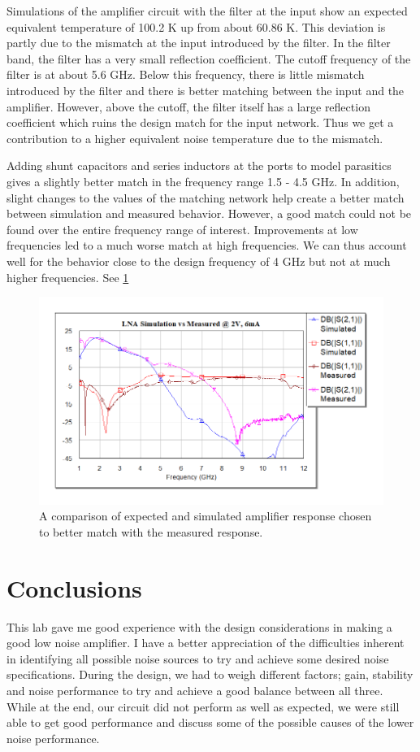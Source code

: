 \documentclass[twocolumn, aps, floatfix]{revtex4-1}
\begin{document}
Simulations of the amplifier circuit with the filter at the input show an expected equivalent temperature of 100.2 K up from about 60.86 K. This deviation is partly due to the mismatch at the input introduced by the filter. In the filter band, the filter has a very small reflection coefficient. The cutoff frequency of the filter is at about 5.6 GHz. Below this frequency, there is little mismatch introduced by the filter and there is better matching between the input and the amplifier. However, above the cutoff, the filter itself has a large reflection coefficient which ruins the design match for the input network. Thus we get a contribution to a higher equivalent noise temperature due to the mismatch.

Adding shunt capacitors and series inductors at the ports to model parasitics gives a slightly better match in the frequency range 1.5 - 4.5 GHz. In addition, slight changes to the values of the matching network help create a better match between simulation and measured behavior. However, a good match could not be found over the entire frequency range of interest. Improvements at low frequencies led to a much worse match at high frequencies. We can thus account well for the behavior close to the design frequency of 4 GHz but not at much higher frequencies. See \ref{fig:changedampsims}

    \begin{figure}[!htbp]
    \centering
    \includegraphics[scale=0.4]{LNA_simulated_measured.png}
    \caption{A comparison of expected and simulated amplifier response chosen to better match with the measured response.}
    \label{fig:changedampsims}
    \end{figure}

\FloatBarrier
\section*{Conclusions}

This lab gave me good experience with the design considerations in making a good low noise amplifier. I have a better appreciation of the difficulties inherent in identifying all possible noise sources to try and achieve some desired noise specifications. During the design, we had to weigh different factors; gain, stability and noise performance to try and achieve a good balance between all three. While at the end, our circuit did not perform as well as expected, we were still able to get good performance and discuss some of the possible causes of the lower noise performance.
\end{document}
